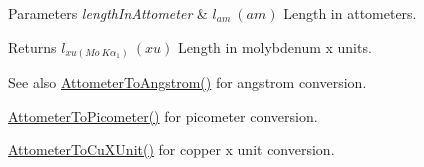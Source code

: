 \begin{DoxyParams}{Parameters}
{\em length\+In\+Attometer} & $ l_{am}\ (am)$ Length in attometers. \\
\hline
\end{DoxyParams}
\begin{DoxyReturn}{Returns}
$ l_{xu(Mo\ K\alpha_1)}\ (xu)$ Length in molybdenum x units. 
\end{DoxyReturn}
\begin{DoxySeeAlso}{See also}
\mbox{\hyperlink{group___e_g_x_math-_conversions-_length_conversions-_attometer-_non-_s_i_ga331ff6e8159f6f00bb7a20e39fa4d756}{Attometer\+To\+Angstrom()}} for angstrom conversion. 

\mbox{\hyperlink{group___e_g_x_math-_conversions-_length_conversions-_attometer-_s_i_ga46ccf47b501bffeb16bc792377e55991}{Attometer\+To\+Picometer()}} for picometer conversion. 

\mbox{\hyperlink{group___e_g_x_math-_conversions-_length_conversions-_attometer-_non-_s_i_gabd388c2e0821ac9066b4fb87e35402b1}{Attometer\+To\+Cu\+X\+Unit()}} for copper x unit conversion. 
\end{DoxySeeAlso}
